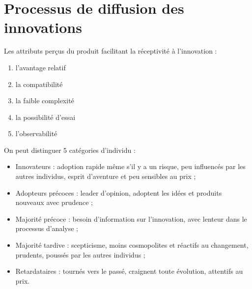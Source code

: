 	\section{Processus de diffusion des innovations}
	
	Les attributs perçus du produit facilitant la réceptivité à l'innovation :
	
	\begin{enumerate}
		\item l'avantage relatif
		\item la compatibilité
		\item la faible complexité
		\item la possibilité d'essai
		\item l'observabilité
	\end{enumerate}
	
	
	On peut distinguer 5 catégories d'individu :
	
	\begin{itemize}
		\item Innovateurs : adoption rapide même s'il y a un risque, peu influencés par les autres individus, esprit d'aventure et peu sensibles au prix ;
		\item Adopteurs précoces : leader d'opinion, adoptent les idées et produits nouveaux avec prudence ; 
		\item Majorité précoce : besoin d'information sur l'innovation, avec lenteur dans le processus d'analyse ;
			
		\item Majorité tardive : scepticisme, moins cosmopolites et réactifs au changement, prudents, poussés par les autres individus ;
			
		\item Retardataires : tournés vers le passé, craignent toute évolution, attentifs au prix.
	\end{itemize}
	
	\begin{comment}

		Caractéristique des premières catégories d'adopteurs :
		\begin{itemize}
			\item status socioéconomique : plus longue éducation, .................
			\item personnalité
			\item communication
		\end{itemize}
	\end{comment}
		
